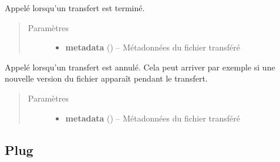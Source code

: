 \documentclass[letterpaper,10pt,english]{sphinxmanual}
\begin{document}
\begin{fulllineitems}
\label{drivers:end_upload}
Appelé lorsqu'un transfert est terminé.
\begin{quote}\begin{description}
\item[{Paramètres}] \leavevmode\begin{itemize}
\item {} 
\textbf{metadata} ({\hyperref[drivers:onitu.api.metadata.Metadata]{}}) -- Métadonnées du fichier transféré

\end{itemize}

\end{description}\end{quote}

\end{fulllineitems}


\begin{fulllineitems}
\label{drivers:abort_upload}
Appelé lorsqu'un transfert est annulé. Cela peut arriver par exemple si une nouvelle version du fichier apparaît pendant le transfert.
\begin{quote}\begin{description}
\item[{Paramètres}] \leavevmode\begin{itemize}
\item {} 
\textbf{metadata} ({\hyperref[drivers:onitu.api.metadata.Metadata]{}}) -- Métadonnées du fichier transféré

\end{itemize}

\end{description}\end{quote}

\end{fulllineitems}



\subsection{Plug}
\label{drivers:the-plug}
\end{document}

